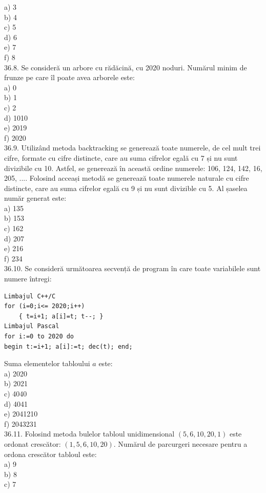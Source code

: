 \begin{itemize}
\begin{enumerate}
a) 3
\\
b) 4
\\
c) 5
\\
d) 6
\\
e) 7
\\
f) 8
\\
36.8. Se consideră un arbore cu rădăcină, cu 2020 noduri. Numărul minim de frunze pe care îl poate avea arborele este:
\\
a) 0
\\
b) 1
\\
c) 2
\\
d) 1010
\\
e) 2019
\\
f) 2020
\\
36.9. Utilizând metoda backtracking se generează toate numerele, de cel mult trei cifre, formate cu cifre distincte, care au suma cifrelor egală cu 7 și nu sunt divizibile cu 10. Astfel, se generează în această ordine numerele: 106, 124, 142, 16, 205, .... Folosind acceași metodă se generează toate numerele naturale cu cifre distincte, care au suma cifrelor egală cu 9 și nu sunt divizible cu 5. Al șaselea număr generat este:
\\
a) 135
\\
b) 153
\\
c) 162
\\
d) 207
\\
e) 216
\\
f) 234
\\
36.10. Se consideră următoarea secvență de program în care toate variabilele sunt numere întregi:
\begin{verbatim}
Limbajul C++/C
for (i=0;i<= 2020;i++)
    { t=i+1; a[i]=t; t--; }
Limbajul Pascal
for i:=0 to 2020 do
begin t:=i+1; a[i]:=t; dec(t); end;
\end{verbatim}
Suma elementelor tabloului $a$ este:
\\
a) 2020
\\
b) 2021
\\
c) 4040
\\
d) 4041
\\
e) 2041210
\\
f) 2043231
\\
36.11. Folosind metoda bulelor tabloul unidimensional $(5,6,10,20,1)$ este ordonat crescător: $(1,5,6,10,20)$. Numărul de parcurgeri necesare pentru a ordona crescător tabloul este:
\\
a) 9
\\
b) 8
\\
c) 7
\\

\end{enumerate}
\end{itemize}
